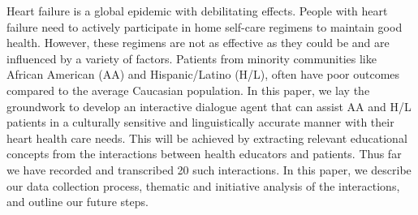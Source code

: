 Heart failure is a global epidemic with debilitating effects. People with heart failure need to actively participate in home self-care regimens to maintain good health. However, these regimens are not as effective as they could be and are influenced by a variety of factors. Patients from minority communities like African American (AA) and Hispanic/Latino (H/L), often have poor outcomes compared to the average Caucasian population. In this paper, we lay the groundwork to develop an interactive dialogue agent that can assist AA and H/L patients in a culturally sensitive and linguistically accurate manner with their heart health care needs. This will be achieved by extracting relevant educational concepts from the interactions between health educators and patients. Thus far we have recorded and transcribed 20 such interactions. In this paper, we describe our data collection process, thematic and initiative analysis of the interactions, and outline our future steps.
